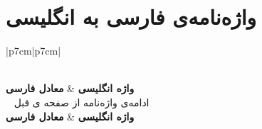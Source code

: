 \chapter*{واژه‌نامه‌ی فارسی به انگلیسی}
\pagestyle{style9}

\begin{longtable}{|p{7cm}|p{7cm}|}
\caption[]{واژه‌نامه‌ی فارسی به انگلیسی}\\
\hline
\textbf{واژه انگلیسی} & \textbf{معادل فارسی} \\
\hline
\endfirsthead
{}%
{{\tablename\ \thetable{}   ادامه‌ی واژه‌نامه از صفحه ی قبل}} \\
\hline
\textbf{واژه انگلیسی} & \textbf{معادل فارسی} \\
\hline
\endhead
\hline {} \\ 
\endfoot
\hline
\endlastfoot


\end{longtable}
